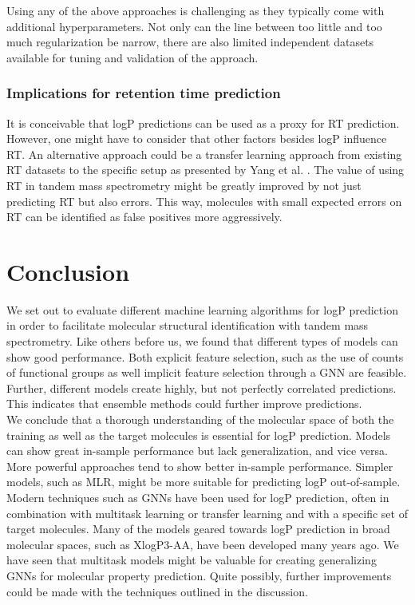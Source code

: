 \documentclass{article}
\theoremstyle{definition}
\theoremstyle{remark}
\begin{document}
Using any of the above approaches is challenging as they typically come with additional hyperparameters. Not only can the line between too little and too much regularization be narrow, there are also limited independent datasets available for tuning and validation of the approach. \\

\subsubsection{Implications for retention time prediction}

It is conceivable that logP predictions can be used as a proxy for RT prediction. However, one might have to consider that other factors besides logP influence RT. An alternative approach could be a transfer learning approach from existing RT datasets to the specific setup as presented by Yang et al. \cite{yang2021prediction}. The value of using RT in tandem mass spectrometry might be greatly improved by not just predicting RT but also errors. This way, molecules with small expected errors on RT can be identified as false positives more aggressively.

\section{Conclusion}

We set out to evaluate different machine learning algorithms for logP prediction in order to facilitate molecular structural identification with tandem mass spectrometry. Like others before us, we found that different types of models can show good performance. Both explicit feature selection, such as the use of counts of functional groups as well implicit feature selection through a GNN are feasible. Further, different models create highly, but not perfectly correlated predictions. This indicates that ensemble methods could further improve predictions.\\

We conclude that a thorough understanding of the molecular space of both the training as well as the target molecules is essential for logP prediction. Models can show great in-sample performance but lack generalization, and vice versa. More powerful approaches tend to show better in-sample performance. Simpler models, such as MLR, might be more suitable for predicting logP out-of-sample. \\

Modern techniques such as GNNs have been used for logP prediction, often in combination with multitask learning or transfer learning and with a specific set of target molecules. Many of the models geared towards logP prediction in broad molecular spaces, such as XlogP3-AA, have been developed many years ago. We have seen that multitask models might be valuable for creating generalizing GNNs for molecular property prediction. Quite possibly, further improvements could be made with the techniques outlined in the discussion.

 

\end{document}

